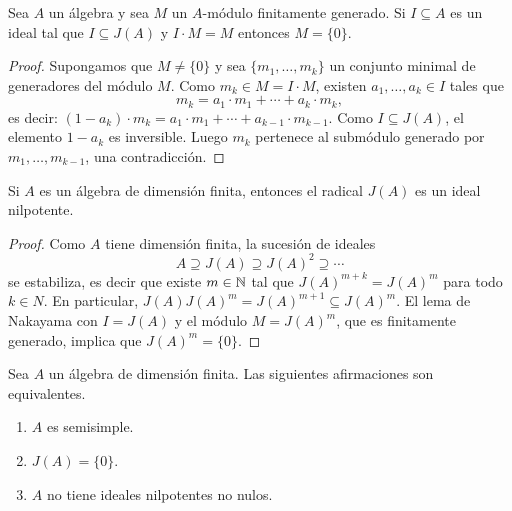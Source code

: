 \begin{lemma}[Nakayama] 
	Sea $A$ un álgebra y sea $M$ un $A$-módulo finitamente generado. Si
	$I\subseteq A$ es un ideal tal que $I\subseteq J(A)$ y $I\cdot M=M$
	entonces $M=\{0\}$.
\end{lemma}

\begin{proof}
	Supongamos que $M\ne\{0\}$ y sea $\{m_1,\dots,m_k\}$ un conjunto minimal de generadores del
	módulo $M$. Como $m_k\in M=I\cdot M$, existen $a_1,\dots,a_k\in I$ tales
	que 
	\[
	m_k=a_1\cdot m_1+\cdots+a_k\cdot m_k,
	\]
	es decir: 
	$(1-a_k)\cdot m_k=a_1\cdot m_1+\cdots+a_{k-1}\cdot m_{k-1}$. Como $I\subseteq J(A)$, el elemento 
	$1-a_k$ es inversible. Luego $m_k$ pertenece al submódulo generado
	por $m_1,\dots,m_{k-1}$, una contradicción.
\end{proof}

\begin{proposition}
Si $A$ es un álgebra de dimensión finita, entonces el radical $J(A)$ es un ideal nilpotente. 	
\end{proposition}

\begin{proof}
	Como $A$ tiene dimensión finita, la sucesión de ideales
	\[
	A\supseteq J(A)\supseteq J(A)^2\supseteq\cdots
	\]
	se estabiliza, es decir que existe $m\in\mathbb{N}$ tal que $J(A)^{m+k}=J(A)^m$ para todo $k\in N$. 
	En particular, 
	$J(A)J(A)^m=J(A)^{m+1}\subseteq J(A)^m$. El lema de Nakayama con $I=J(A)$ y el módulo $M=J(A)^m$, 
	que es finitamente generado, 
	implica que $J(A)^m=\{0\}$.  
\end{proof}

\begin{theorem}
Sea $A$ un álgebra de dimensión finita. Las siguientes afirmaciones son equivalentes.
\begin{enumerate}
\item $A$ es semisimple.
\item $J(A)=\{0\}$.
\item $A$ no tiene ideales nilpotentes no nulos.
\end{enumerate}
\end{theorem}

